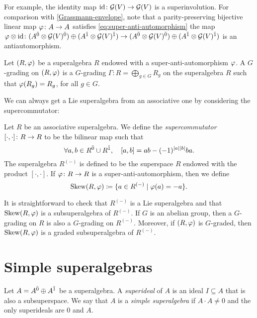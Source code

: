For example, the identity map $\operatorname{id}\colon \mathcal G(V) \to \mathcal G(V)$ is a superinvolution. 
For comparison with \cref{Grassmann-envelope}, note that a parity-preserving bijective linear map $\varphi\colon A \to A$ satisfies \cref{eq:super-anti-automorphism} \IFF the map $\varphi \otimes \operatorname{id} \colon (A^{\bar0}\otimes \mathcal G(V)^{\bar0}) \oplus (A^{\bar1}\otimes \mathcal G(V)^{\bar1}) \to (A^{\bar0}\otimes \mathcal G(V)^{\bar0}) \oplus (A^{\bar1}\otimes \mathcal G(V)^{\bar1})$ is an antiautomorphism. 

\begin{defi}\label{defi:grd-superinv}
    Let $(R, \varphi)$ be a superalgebra $R$ endowed with a super\--anti\--auto\-mor\-phism $\varphi$. 
    A $G$-grading on $(R, \varphi)$ is a $G$-grading $\Gamma : R = \bigoplus_{g \in G} R_g$ on the superalgebra $R$ such that $\varphi(R_g) = R_g$, for all $g\in G$. 
\end{defi}

We can always get a Lie superalgebra from an associative one by considering the supercommutator:

\begin{defi}\label{defi:supercommutator}
    Let $R$ be an associative superalgebra. 
    We define the \emph{supercommutator} $[\cdot, \cdot]\colon R \to R$ to be the bilinear map such that
    \[
        \forall a,b\in R^{\bar0} \cup R^{\bar1}, \quad [a,b] = ab - (-1)^{|a||b|} ba.
    \]
    The superalgebra $R^{(-)}$ is defined to be the superspace $R$ endowed with the product $[\cdot, \cdot]$. 
    If $\varphi\colon R\to R$ is a super-anti-automorphism, then we define
    \[
        \operatorname{Skew}(R, \varphi) \coloneqq \{a \in R^{(-)} \mid \varphi(a) = -a \}.
    \]
\end{defi}

It is straightforward to check that $R^{(-)}$ is a Lie superalgebra and that $\operatorname{Skew}(R, \varphi)$ is a subsuperalgebra of $R^{(-)}$. 
If $G$ is an abelian group, then a $G$-grading on $R$ is also a $G$-grading on $R^{(-)}$. 
Moreover, if $(R, \varphi)$ is $G$-graded, then $\operatorname{Skew} (R, \varphi)$ is a graded subsuperalgebra of $R^{(-)}$. 

\section{Simple superalgebras}\label{sec:simple-algebras}

\begin{defi}
    Let $A = A^{\bar0} \oplus A^{\bar1}$ be a superalgebra. 
    A \emph{superideal} of $A$ is an ideal $I \subseteq A$ that is also a subsuperspace. 
    We say that $A$ is a  \emph{simple superalgebra} if $A\cdot A \neq 0$ and the only superideals are $0$ and $A$.
\end{defi}


